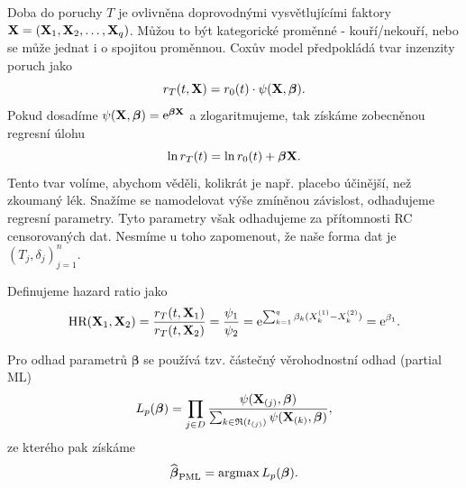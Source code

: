     Doba do poruchy $T$ je ovlivněna doprovodnými vysvětlujícími faktory $\bold{X} =  (\bold{X}_1, \bold{X}_2,\dots, \bold{X}_q)$. Můžou to být kategorické proměnné - kouří/nekouří, nebo se může jednat i o spojitou proměnnou. Coxův model předpokládá tvar inzenzity poruch jako
    $$ r_T(t,\bold{X}) = r_0(t) \cdot \psi(\bold{X}, \boldsymbol{\beta}).$$
    Pokud dosadíme $\psi(\bold{X}, \boldsymbol{\beta}) = \mathrm{e}^{\boldsymbol{\beta}\bold{X}} $ a zlogaritmujeme, tak získáme zobecněnou regresní úlohu
    $$\ln r_T(t) = \ln r_0(t) + \boldsymbol{\beta}\bold{X}. $$
    Tento tvar volíme, abychom věděli, kolikrát je např. placebo účinější, než zkoumaný lék.
    Snažíme se namodelovat výše zmíněnou závislost, odhadujeme regresní parametry. Tyto parametry však odhadujeme za přítomnosti RC censorovaných dat. Nesmíme u toho zapomenout, že naše forma dat je $(T_j, \delta_j)_{j=1}^n$. 
    
   \begin{define}
    Definujeme hazard ratio jako
    $$ \mathrm{HR(\bold{X}_1, \bold{X}_2)} = \frac{r_T(t, \bold{X}_1)}{r_T(t, \bold{X}_2)} = \frac{\psi_1}{\psi_2} = \mathrm{e}^{\sum_{k=1}^{q} \beta_k(X_k^{(1)}- X_k^{(2)})} = \mathrm{e}^{\beta_1}.$$
    \end{define}
    
    Pro odhad parametrů $\boldsymbol{\beta}$ se používá tzv. částečný věrohodnostní odhad (partial ML)
    $$L_p(\boldsymbol{\beta})  =\prod_{j\in D } \frac{\psi(\bold{X}_{(j)}, \boldsymbol{\beta})}{\sum_{k \in \mathfrak{R}(t_{(j)})}\psi(\bold{X}_{(k)}, \boldsymbol{\beta})},$$
    ze kterého pak získáme
    $$ \widehat{\boldsymbol{\beta}}_\mathrm{PML} = \mathop{\mathrm{argmax}} L_p(\boldsymbol{\beta}).$$


